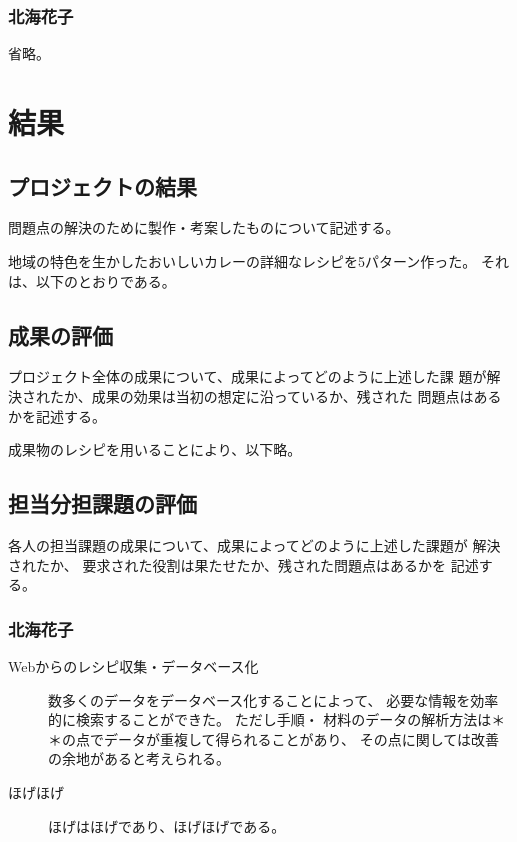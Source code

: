 \documentclass[openany,11pt,papersize]{jsbook}
\begin{document}
\subsection{北海花子}
省略。



\chapter{結果}

\section{プロジェクトの結果}
\begin{hissu}
問題点の解決のために製作・考案したものについて記述する。
\end{hissu}
地域の特色を生かしたおいしいカレーの詳細なレシピを5パターン作った。 
それは、以下のとおりである。


\section{成果の評価}
\begin{hissu}
 プロジェクト全体の成果について、成果によってどのように上述した課
 題が解決されたか、成果の効果は当初の想定に沿っているか、残された
 問題点はあるかを記述する。
\end{hissu}

成果物のレシピを用いることにより、以下略。




\section{担当分担課題の評価}
\begin{hissu}
各人の担当課題の成果について、成果によってどのように上述した課題が
解決されたか、 要求された役割は果たせたか、残された問題点はあるかを
記述する。
\end{hissu}

\subsection{北海花子}
\begin{description}
 \item[Webからのレシピ収集・データベース化] 
  数多くのデータをデータベース化することによって、
  必要な情報を効率的に検索することができた。 ただし手順・
  材料のデータの解析方法は＊＊の点でデータが重複して得られることがあり、
  その点に関しては改善の余地があると考えられる。 
 \item[ほげほげ]
  ほげはほげであり、ほげほげである。
\end{description}
\end{document}
